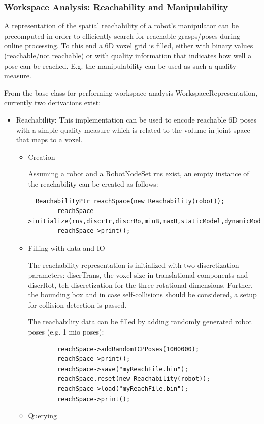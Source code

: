\subsubsection{Workspace Analysis: Reachability and Manipulability}
 A representation of the spatial reachability of a robot's manipulator can be precomputed in order to efficiently search for reachable grasps/poses during online processing. To this end a 6D voxel grid is filled, either with binary values (reachable/not reachable) or with quality information that indicates how well a pose can be reached. E.g. the manipulability can be used as such a quality measure.
\par
From the base class for performing workspace analysis WorkspaceRepresentation, currently two derivations exist: 
\begin{itemize}
\item Reachability: This implementation can be used to encode reachable 6D poses with a simple quality measure which is related to the volume in joint space that maps to a voxel.
\begin{itemize}
\item Creation \par
Assuming a robot and a RobotNodeSet rns exist, an empty instance of the reachability can be created as follows:
\begin{lstlisting}
  ReachabilityPtr reachSpace(new Reachability(robot));
        reachSpace->initialize(rns,discrTr,discrRo,minB,maxB,staticModel,dynamicModel,baseNode,tcpNode);
        reachSpace->print();
\end{lstlisting}
\item Filling with data and IO  \par
 The reachability representation is initialized with two discretization parameters: discrTrans, the voxel size in translational components and discrRot, teh discretization for the three rotational dimensions. Further, the bounding box and in case self-collisions should be considered, a setup for collision detection is passed.\par
 The reachability data can be filled by adding randomly generated robot poses (e.g. 1 mio poses): 
 \begin{lstlisting}
        reachSpace->addRandomTCPPoses(1000000);
        reachSpace->print();
        reachSpace->save("myReachFile.bin");
        reachSpace.reset(new Reachability(robot));
        reachSpace->load("myReachFile.bin");
        reachSpace->print();
 \end{lstlisting}
 \item Querying  \par

\end{itemize}
\end{itemize}
